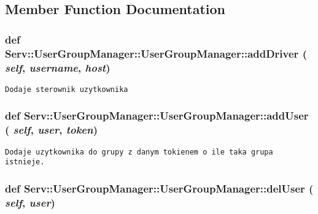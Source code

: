 \subsection{Member Function Documentation}
\hypertarget{class_serv_1_1_user_group_manager_1_1_user_group_manager_ea0f7f8d1d6e4d5efce31f3d0ea35fd9}{
\subsubsection[{addDriver}]{\setlength{\rightskip}{0pt plus 5cm}def Serv::UserGroupManager::UserGroupManager::addDriver ( {\em self}, \/   {\em username}, \/   {\em host})}}
\label{class_serv_1_1_user_group_manager_1_1_user_group_manager_ea0f7f8d1d6e4d5efce31f3d0ea35fd9}




\footnotesize\begin{verbatim}Dodaje sterownik uzytkownika

\end{verbatim}
\normalsize
 \hypertarget{class_serv_1_1_user_group_manager_1_1_user_group_manager_46ee225566738a93c7c036b464a931fb}{
\subsubsection[{addUser}]{\setlength{\rightskip}{0pt plus 5cm}def Serv::UserGroupManager::UserGroupManager::addUser ( {\em self}, \/   {\em user}, \/   {\em token})}}
\label{class_serv_1_1_user_group_manager_1_1_user_group_manager_46ee225566738a93c7c036b464a931fb}




\footnotesize\begin{verbatim}Dodaje uzytkownika do grupy z danym tokienem o ile taka grupa istnieje.

\end{verbatim}
\normalsize
 \hypertarget{class_serv_1_1_user_group_manager_1_1_user_group_manager_4b747272c8166d17b9458b3f8c4796f0}{
\subsubsection[{delUser}]{\setlength{\rightskip}{0pt plus 5cm}def Serv::UserGroupManager::UserGroupManager::delUser ( {\em self}, \/   {\em user})}}
\label{class_serv_1_1_user_group_manager_1_1_user_group_manager_4b747272c8166d17b9458b3f8c4796f0}




